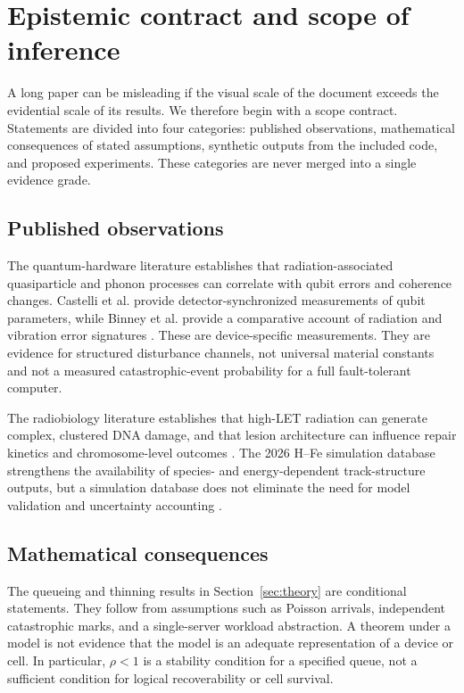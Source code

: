 \documentclass[11pt,a4paper,oneside]{article}
\begin{document}
\section{Epistemic contract and scope of inference}
\label{sec:epistemic}
A long paper can be misleading if the visual scale of the document exceeds the evidential scale of its results. We therefore begin with a scope contract. Statements are divided into four categories: published observations, mathematical consequences of stated assumptions, synthetic outputs from the included code, and proposed experiments. These categories are never merged into a single evidence grade.

\subsection{Published observations}
The quantum-hardware literature establishes that radiation-associated quasiparticle and phonon processes can correlate with qubit errors and coherence changes. Castelli et al. provide detector-synchronized measurements of qubit parameters, while Binney et al. provide a comparative account of radiation and vibration error signatures \citep{Castelli2026,Binney2026}. These are device-specific measurements. They are evidence for structured disturbance channels, not universal material constants and not a measured catastrophic-event probability for a full fault-tolerant computer.

The radiobiology literature establishes that high-LET radiation can generate complex, clustered DNA damage, and that lesion architecture can influence repair kinetics and chromosome-level outcomes \citep{Hagiwara2019,Shibata2022,Goodhead2024,Wilkinson2023}. The 2026 H--Fe simulation database strengthens the availability of species- and energy-dependent track-structure outputs, but a simulation database does not eliminate the need for model validation and uncertainty accounting \citep{Huang2026}.

\subsection{Mathematical consequences}
The queueing and thinning results in Section~\ref{sec:theory} are conditional statements. They follow from assumptions such as Poisson arrivals, independent catastrophic marks, and a single-server workload abstraction. A theorem under a model is not evidence that the model is an adequate representation of a device or cell. In particular, \(\rho<1\) is a stability condition for a specified queue, not a sufficient condition for logical recoverability or cell survival.
\end{document}
